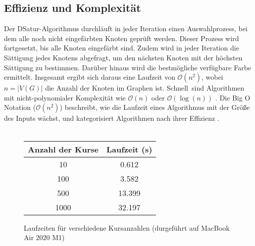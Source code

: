 \subsection{Effizienz und Komplexität}
Der DSatur-Algorithmus durchläuft in jeder Iteration einen Auswahlprozess, bei dem alle noch nicht eingefärbten Knoten geprüft werden. Dieser Prozess wird fortgesetzt, bis alle Knoten eingefärbt sind. Zudem wird in jeder Iteration die Sättigung jedes Knotens abgefragt, um den nächsten Knoten mit der höchsten Sättigung zu bestimmen. Darüber hinaus wird die bestmögliche verfügbare Farbe ermittelt. Insgesamt ergibt sich daraus eine Laufzeit von $\mathcal{O}(n^2)$, wobei $n = |V(G)|$ die Anzahl der Knoten im Graphen ist. \glqq Schnell\grqq \, sind Algorithmen mit nicht-polynomialer Komplexität wie $\mathcal{O}(n)$ oder $\mathcal{O}(\log(n))$ \parencite{leismann-2023}.
Die Big O Notation ($\mathcal{O}(n^2)$) beschreibt, wie die Laufzeit eines Algorithmus mit der Größe des Inputs wächst, und kategorisiert Algorithmen nach ihrer Effizienz \parencite{leismann-2023}.\\\\
\begin{figure}[h!]
\centering
\begin{tabular}{@{}cc@{}}
\toprule
\textbf{Anzahl der Kurse} & \textbf{Laufzeit (s)} \\ \midrule
10                        & 0.612                 \\
100                       & 3.582                 \\
500                       & 13.399                \\
1000                      & 32.197                \\ \bottomrule
\end{tabular}
\caption[Laufzeiten für verschiedene Kursanzahlen]{Laufzeiten für verschiedene Kursanzahlen (durgeführt auf MacBook Air 2020 M1)}
\label{tab:laufzeiten}
\end{figure}
